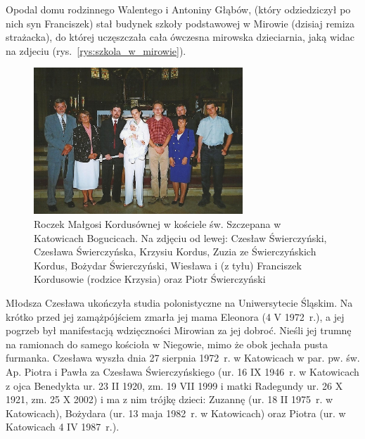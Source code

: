 Opodal domu rodzinnego Walentego i Antoniny Głąbów, (który odziedziczył po nich syn Franciszek) stał budynek szkoły podstawowej w Mirowie (dzisiaj remiza strażacka), do której uczęszczała cała ówczesna mirowska dzieciarnia, jaką widac na zdjeciu (rys.~\ref{rys:szkola_w_mirowie}).

\begin{figure}[!h]
\begin{center}
\includegraphics[width=0.7\textwidth]{zdjecia/roczek_malgorzaty_kordus.jpg}
\caption[Roczek Małgorzaty Kordus]{Roczek Małgosi Kordusównej w kościele św. Szczepana w Katowicach Bogucicach. Na zdjęciu od lewej: Czesław Świerczyński, Czesława Świerczyńska, Krzysiu Kordus, Zuzia ze Świerczyńskich Kordus, Bożydar Świerczyński, Wiesława i (z tyłu) Franciszek Kordusowie (rodzice Krzysia) oraz Piotr Świerczyński}
\label{rys:roczek_malgorzaty_kordus}
\end{center}
\end{figure}

Młodsza Czesława ukończyła studia polonistyczne na Uniwersytecie Śląskim. Na krótko przed jej zamążpójściem zmarła jej mama Eleonora (4 V 1972~r.), a jej pogrzeb był manifestacją wdzięczności Mirowian za jej dobroć. Nieśli jej trumnę na ramionach do samego kościoła w Niegowie, mimo że obok jechała pusta furmanka. Czesława wyszła dnia 27 sierpnia 1972~r.  w Katowicach w par. pw. św. Ap. Piotra i Pawła za Czesława Świerczyńskiego (ur. 16 IX 1946~r. w Katowicach z ojca Benedykta ur. 23 II 1920, zm. 19 VII 1999 i matki Radegundy ur. 26 X 1921, zm. 25 X 2002) i ma z nim trójkę dzieci: Zuzannę (ur. 18 II 1975~r. w Katowicach), Bożydara (ur. 13 maja 1982~r. w Katowicach) oraz Piotra (ur. w Katowicach 4 IV 1987~r.).

